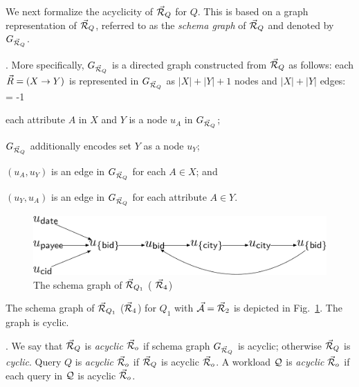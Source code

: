
We next formalize the acyclicity of \bds $\vec{{\mathcal R}}_{Q}$ for $Q$.
This is based on a graph representation of $\vec{{\mathcal R}}_{Q}$, referred to
as the {\em schema graph} of $\vec{{\mathcal R}}_{Q}$ and denoted by
$G_{\vec{{\mathcal R}}_{Q}}$.


. More specifically, $G_{\vec{{\mathcal R}}_{Q}}$ is a
directed graph constructed from $\vec{{\mathcal R}}_{Q}$ as follows: each \bs
$\vec{R} = (X\rightarrow Y)$ is represented in $G_{\vec{{\mathcal R}}_{Q}}$ as $|X|+|Y|+1$
nodes and $|X|+|Y|$ edges:
\looseness = -1
\mbi
\item each attribute $A$ in $X$ and $Y$ is a node $u_{A}$ in $G_{\vec{{\mathcal R}}_{Q}}$;
\item $G_{\vec{{\mathcal R}}_{Q}}$ additionally encodes set $Y$ as a node $u_{Y}$;
\item $(u_{A}, u_{Y})$ is an edge in $G_{\vec{{\mathcal R}}_{Q}}$ for each $A\in X$; and
\item $(u_{Y}, u_{A})$ is an edge in $G_{\vec{{\mathcal R}}_{Q}}$ for each attribute $A\in Y$.
\mei 

\begin{figure}
\includegraphics[width=1\columnwidth]{fig/schemagraph.pdf}
\caption{The schema graph of $\vec{{\mathcal R}}_{Q_{1}}$ (\ie
  $\vec{{\mathcal R}}_{4}$) \label{fig-schemagraph}}
\vspace{-2ex}
\end{figure}

\begin{example}\label{exa-schemagraph}
The schema graph of $\vec{{\mathcal R}}_{Q_{1}}$ (\ie $\vec{{\mathcal R}}_{4}$) for
$Q_{1}$ with $\vec{{\mathcal A}} = \vec{{\mathcal R}}_{2}$ is depicted in
Fig.~\ref{fig-schemagraph}. The graph is cyclic.
\end{example}


.
We say that $\vec{{\mathcal R}}_{Q}$ is {\em acyclic \wrt $\vec{{\mathcal R}}_{o}$} if schema
graph $G_{\vec{{\mathcal R}}_{Q}}$ is acyclic; otherwise $\vec{{\mathcal R}}_{Q}$ is
{\em cyclic}. Query $Q$ is {\em acyclic} \wrt $\vec{{\mathcal R}}_{o}$ if
$\vec{{\mathcal R}}_{Q}$ is acyclic \wrt $\vec{{\mathcal R}}_{o}$. A workload $\mathcal Q$ is
{\em acyclic} \wrt $\vec{{\mathcal R}}_{o}$ if each query in $\mathcal Q$ is acyclic \wrt
$\vec{{\mathcal R}}_{o}$.


